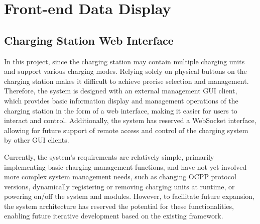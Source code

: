 \documentclass[
english,
ruledheaders=section,%
class=report,%
thesis={type=Report},%
accentcolor=9c,%
custommargins=true,%
marginpar=false,%
parskip=half-,%
fontsize=11pt,%
logofile={img/tuda_logo.pdf}, %
]{tudapub}
\begin{document}
    \chapter{Front-end Data Display}
    \label{chap:Front-end Display}


    \section{Charging Station Web Interface}
    \label{sec:CPWeb}
    In this project, since the charging station may contain multiple charging units and support various charging modes. Relying solely on physical buttons on the charging station makes it difficult to achieve precise selection and management. Therefore, the system is designed with an external management GUI client, which provides basic information display and management operations of the charging station in the form of a web interface, making it easier for users to interact and control. Additionally, the system has reserved a WebSocket interface, allowing for future support of remote access and control of the charging system by other GUI clients.

    Currently, the system's requirements are relatively simple, primarily implementing basic charging management functions, and have not yet involved more complex system management needs, such as changing OCPP protocol versions, dynamically registering or removing charging units at runtime, or powering on/off the system and modules. However, to facilitate future expansion, the system architecture has reserved the potential for these functionalities, enabling future iterative development based on the existing framework.
\end{document}
